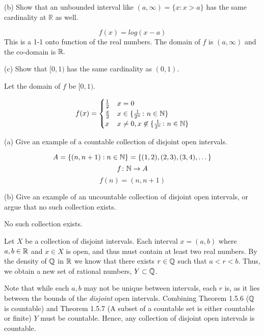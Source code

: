 \documentclass{report}
\begin{document}
\par \bigskip
(b) Show that an unbounded interval like $(a, \infty)=\{x: x>a\}$ has the same cardinality at $\mathbb{R}$ as well.

\sol
$$
f(x)=log(x-a)
$$
This is a 1-1 onto function of the real numbers. The domain of $f$ is $(a, \infty)$ and the co-domain is $\RR.$

\par \bigskip
(c) Show that $[0,1)$ has the same cardinality as $(0,1)$. 


\bigskip
\sol
Let the domain of $f$ be $[0,1).$

$$ f(x) = 
  \begin{cases} 
    \frac{1}{2} & x= 0 \\
    \frac{x}{2} &  x \in \{ \frac{1}{2^n} \colon n \in \NN \} \\
    x & x \neq 0, x \not\in \{ \frac{1}{2^n} \colon n \in \NN \}
   \end{cases}
$$
\sol


 (a) Give an example of a countable collection of disjoint open intervals.
\par \bigskip

$$A=\{(n, n+1): n \in \NN\} = \{(1,2),(2,3),(3,4),\dots\}$$
$$
f \colon \NN \rightarrow A 
$$ $$ f(n)= (n, n+1)$$
\par \bigskip

 (b) Give an example of an uncountable collection of disjoint open intervals, or argue that no such collection exists.


No such collection exists.

\begin{myproof}
    
Let $X$ be a collection of disjoint intervals. Each interval $x =(a,b)$ where $a,b \in \RR$ and $x\in X$ is open, and thus must contain at least two real numbers. By the density of $\QQ$ in $\RR$ we know that there exists $r \in \QQ$ such that $a < r < b.$ Thus, we obtain a new set of rational numbers, $Y \subset \QQ$.

Note that while each $a, b$ may not be unique between intervals, each $r$ is, as it lies between the bounds of the \textit{disjoint} open intervals. Combining Theorem 1.5.6 ($\QQ$ is countable) and Theorem 1.5.7 (A subset of a countable set is either countable or finite) $Y$ must be countable. Hence, any collection of disjoint open intervals is countable.

\end{myproof}
\end{document}
